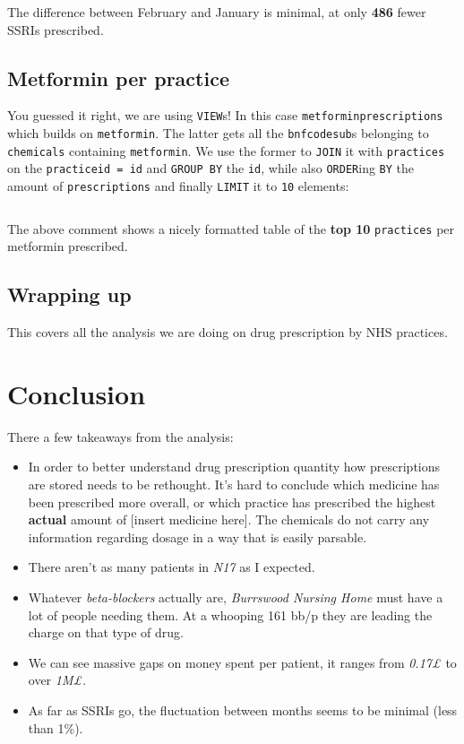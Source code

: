 \documentclass[english,a4paper,]{report}
\begin{document}
\inputminted[firstline=92,lastline=102]{sql}{src/sql/02-queries.sql}

The difference between February and January is minimal, at only
\textbf{486} fewer SSRIs prescribed.

\section{Metformin per practice}\label{metformin-per-practice}

You guessed it right, we are using \texttt{VIEW}s! In this case
\texttt{metforminprescriptions} which builds on \texttt{metformin}. The
latter gets all the \texttt{bnfcodesub}s belonging to \texttt{chemicals}
containing \texttt{metformin}. We use the former to \texttt{JOIN} it
with \texttt{practices} on the \texttt{practiceid\ =\ id} and
\texttt{GROUP\ BY} the \texttt{id}, while also \texttt{ORDER}ing
\texttt{BY} the amount of \texttt{prescriptions} and finally
\texttt{LIMIT} it to \texttt{10} elements:

\inputminted[firstline=107]{sql}{src/sql/02-queries.sql}

The above comment shows a nicely formatted table of the \textbf{top 10}
\texttt{practices} per metformin prescribed.

\section{Wrapping up}\label{wrapping-up-2}

This covers all the analysis we are doing on drug prescription by NHS
practices.

\chapter{Conclusion}\label{conclusion}

There a few takeaways from the analysis:

\begin{itemize}
\item
  In order to better understand drug prescription quantity how
  prescriptions are stored needs to be rethought. It's hard to conclude
  which medicine has been prescribed more overall, or which practice has
  prescribed the highest \textbf{actual} amount of {[}insert medicine
  here{]}. The chemicals do not carry any information regarding dosage
  in a way that is easily parsable.
\item
  There aren't as many patients in \emph{N17} as I expected.
\item
  Whatever \emph{beta-blockers} actually are, \emph{Burrswood Nursing
  Home} must have a lot of people needing them. At a whooping 161 bb/p
  they are leading the charge on that type of drug.
\item
  We can see massive gaps on money spent per patient, it ranges from
  \emph{0.17£} to over \emph{1M£}.
\item
  As far as SSRIs go, the fluctuation between months seems to be minimal
  (less than 1\%).
\end{itemize}
\end{document}
